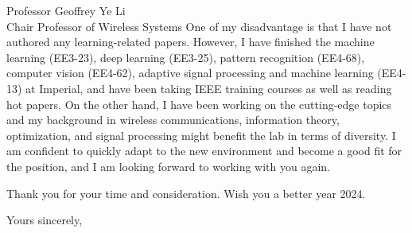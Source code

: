 \documentclass[10pt]{scrartcl}
\begin{document}
\begin{letter}{%
		Professor Geoffrey Ye Li\\
		Chair Professor of Wireless Systems
	}
	One of my disadvantage is that I have not authored any learning-related papers.
	However, I have finished the machine learning (EE3-23), deep learning (EE3-25), pattern recognition (EE4-68), computer vision (EE4-62), adaptive signal processing and machine learning (EE4-13) at Imperial, and have been taking IEEE training courses as well as reading hot papers.
	On the other hand, I have been working on the cutting-edge topics and my background in wireless communications, information theory, optimization, and signal processing might benefit the lab in terms of diversity.
	I am confident to quickly adapt to the new environment and become a good fit for the position, and I am looking forward to working with you again.

	Thank you for your time and consideration. Wish you a better year 2024.
	\closing{Yours sincerely,}
\end{letter}
\end{document}
